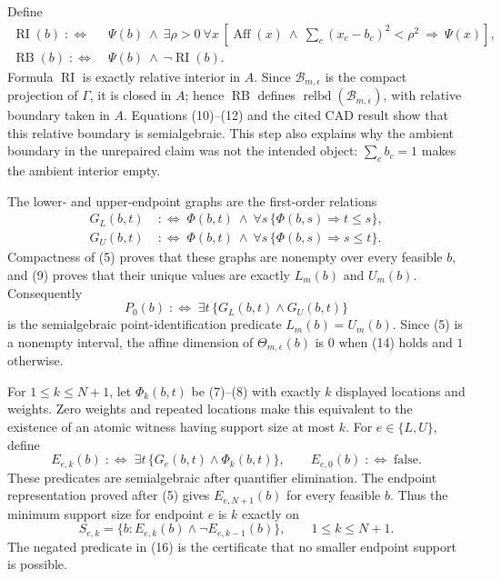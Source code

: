 Define
\[
\begin{split}
\operatorname{RI}(b)\;:\Longleftrightarrow\;&\Psi(b)\ \wedge\ 
\exists\rho>0\ \forall x\,
\left[
\operatorname{Aff}(x)\ \wedge\ \sum_{c}(x_c-b_c)^2<\rho^2
\ \Longrightarrow\ \Psi(x)
\right],\\
\operatorname{RB}(b)\;:\Longleftrightarrow\;&\Psi(b)\ \wedge\ \neg\operatorname{RI}(b).
\end{split}
\tag{12}
\]
Formula \(\operatorname{RI}\) is exactly relative interior in \(A\).  Since \(\mathcal B_{m,\epsilon}\) is the compact projection of \(\Gamma\), it is closed in \(A\); hence \(\operatorname{RB}\) defines
\(\operatorname{relbd}(\mathcal B_{m,\epsilon})\), with relative boundary taken in \(A\).  Equations (10)--(12) and the cited CAD result show that this relative boundary is semialgebraic.  This step also explains why the ambient boundary in the unrepaired claim was not the intended object: \(\sum_cb_c=1\) makes the ambient interior empty.

The lower- and upper-endpoint graphs are the first-order relations
\[
\begin{split}
G_L(b,t)&\;:\Longleftrightarrow\;\Phi(b,t)\ \wedge\ 
\forall s\,\{\Phi(b,s)\Longrightarrow t\leq s\},\\
G_U(b,t)&\;:\Longleftrightarrow\;\Phi(b,t)\ \wedge\ 
\forall s\,\{\Phi(b,s)\Longrightarrow s\leq t\}.
\end{split}
\tag{13}
\]
Compactness of (5) proves that these graphs are nonempty over every feasible \(b\), and (9) proves that their unique values are exactly \(L_m(b)\) and \(U_m(b)\).  Consequently
\[
P_0(b)\;:\Longleftrightarrow\;\exists t\,\{G_L(b,t)\wedge G_U(b,t)\}
\tag{14}
\]
is the semialgebraic point-identification predicate \(L_m(b)=U_m(b)\).  Since (5) is a nonempty interval, the affine dimension of \(\Theta_{m,\epsilon}(b)\) is \(0\) when (14) holds and \(1\) otherwise.

For \(1\leq k\leq N+1\), let \(\Phi_k(b,t)\) be (7)--(8) with exactly \(k\) displayed locations and weights.  Zero weights and repeated locations make this equivalent to the existence of an atomic witness having support size at most \(k\).  For \(e\in\{L,U\}\), define
\[
E_{e,k}(b)\;:\Longleftrightarrow\;
\exists t\,\{G_e(b,t)\wedge\Phi_k(b,t)\},
\qquad
E_{e,0}(b)\;:\Longleftrightarrow\;\mathrm{false}.
\tag{15}
\]
These predicates are semialgebraic after quantifier elimination.  The endpoint representation proved after (5) gives \(E_{e,N+1}(b)\) for every feasible \(b\).  Thus the minimum support size for endpoint \(e\) is \(k\) exactly on
\[
S_{e,k}=\{b:E_{e,k}(b)\wedge\neg E_{e,k-1}(b)\},
\qquad 1\leq k\leq N+1.
\tag{16}
\]
The negated predicate in (16) is the certificate that no smaller endpoint support is possible.

